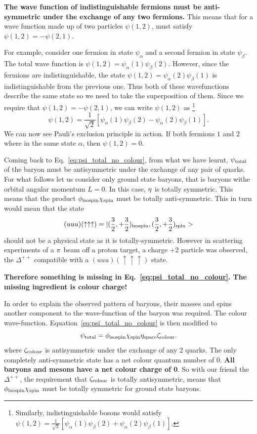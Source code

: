 {\bf The wave function of indistinguishable fermions must be anti-symmetric under the exchange of any two fermions.}
This means that for a wave function made up of two particles $\psi(1,2)$, must satisfy $\psi(1,2)=-\psi(2,1)$.

For example, consider one fermion in state $\psi_\alpha$ and a second fermion in state $\psi_\beta$. The total wave function is $\psi(1,2)=\psi_\alpha(1)\psi_\beta(2)$.
However, since the fermions are indistinguishable, the state  $\psi(1,2)=\psi_\alpha(2)\psi_\beta(1)$ is indistinguishable from the previous one. Thus both of these
wavefunctions describe the same state so we need to take the superposition of them. Since we require that $\psi(1,2)=-\psi(2,1)$, we can write $\psi(1,2)$ as
\footnote{Similarly, indistinguishable bosons would satisfy
$\psi(1,2)=\frac{1}{\sqrt{2}}[ \psi_\alpha(1)\psi_\beta(2)+\psi_\alpha(2)\psi_\beta(1)]$.
}
\[
\psi(1,2)=\frac{1}{\sqrt{2}}[ \psi_\alpha(1)\psi_\beta(2)-\psi_\alpha(2)\psi_\beta(1) ].
\]
We can now see Pauli's exclusion principle in action. If both fermions $1$ and $2$ where in the same state $\alpha$, then  $\psi(1,2)=0$.

Coming back to Eq.~\ref{eq:psi_total_no_colour}, from what we have learnt, $\psi_{\rm total}$ of the baryon must be antisymmetric under the exchange of any pair of quarks. For what follows let us consider only ground state baryons, that is baryons withe orbital angular momentum $L=0$. In this case, $\eta_{\space}$ is totally symmetric. This means that the product $\phi_{\rm isospin}\chi_{\rm spin}$ must be totally anti-symmetric. This in turn would mean that the state
\[
(uuu)(\uparrow\uparrow\uparrow)=|(\frac{3}{2},+\frac{3}{2})_{\rm isospin},(\frac{3}{2},+\frac{3}{2})_{\rm spin}>
\]
should not be a physical state as it is totally-symmetric. However in scattering
experiments of a ${\rm \pi}$ beam off a proton target, a charge +2 particle was observed, the $\Delta^{++}$ compatible with a $(uuu)(\uparrow\uparrow\uparrow)$ state.



{\bf Therefore something is missing in Eq.~\ref{eq:psi_total_no_colour}. The missing ingredient is colour charge!}

In order to explain the observed pattern of baryons, their masses and spins another component to the wave-function of the baryon was required. The colour wave-function. Equation~\ref{eq:psi_total_no_colour} is then modified to
\begin{equation}
\label{eq:psi_total_colour}
\psi_{\rm total}=\phi_{\rm isospin}\chi_{\rm spin}\eta_{\rm space}\zeta_{\rm colour}.
\end{equation}
where $\zeta_{\rm colour}$ is antisymmetric under the exchange of any 2 quarks. 
The only completely anti-symmetric state has a net colour quantum number of 0.
{\bf All baryons and mesons have a net colour charge of 0}. 
So with our friend the $\Delta^{++}$, the requirement that $\zeta_{\rm colour}$ is totally antisymmetric, means that $\phi_{\rm isospin}\chi_{\rm spin}$ must be totally symmetric for ground state baryons.

